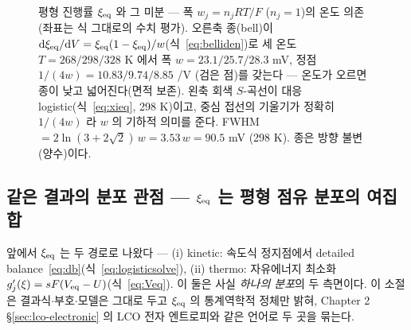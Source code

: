 \begin{figure}[t]
\caption{평형 진행률 $\xi_{\mathrm{eq}}$ 와 그 미분 --- 폭 $w_j{=}n_jRT/F$ ($n_j{=}1$)의 온도 의존(좌표는 식 그대로의
수치 평가). 오른축 종(bell)이 $\mathrm{d}\xi_{\mathrm{eq}}/\mathrm{d} V=\xi_{\mathrm{eq}}(1-\xi_{\mathrm{eq}})/w$(식~\eqref{eq:belliden})로 세 온도
$T{=}268/298/328$ K 에서 폭 $w{=}23.1/25.7/28.3$ mV, 정점 $1/(4w){=}10.83/9.74/8.85$ /V (검은 점)를 갖는다
--- 온도가 오르면 종이 낮고 넓어진다(면적 보존). 왼축 회색 $S$-곡선이 대응 logistic(식~\eqref{eq:xieq}, 298 K)이고,
중심 접선의 기울기가 정확히 $1/(4w)$ 라 $w$ 의 기하적 의미를 준다. FWHM $=2\ln(3{+}2\sqrt2)\,w=3.53\,w=90.5$ mV
(298 K). 종은 방향 불변(양수)이다.}
\label{fig:logistic}
\end{figure}

\subsection{같은 결과의 분포 관점 --- $\xi_{\mathrm{eq}}$ 는 평형 점유 분포의 여집합}\label{sec:dist}
앞에서 $\xi_{\mathrm{eq}}$ 는 두 경로로 나왔다 --- (i) kinetic: 속도식 정지점에서 detailed balance~\eqref{eq:db}(식~\eqref{eq:logisticsolve}),
(ii) thermo: 자유에너지 최소화 $g_j'(\xi)=sF(V_{\mathrm{eq}}-U)$(식~\eqref{eq:Veq}). 이 둘은 사실 \emph{하나의 분포}의 두 측면이다.
이 소절은 결과식$\cdot$부호$\cdot$모델은 그대로 두고 $\xi_{\mathrm{eq}}$ 의 통계역학적 정체만 밝혀,
Chapter 2 \S\ref{sec:lco-electronic} 의 LCO 전자 엔트로피와 같은 언어로 두 곳을 묶는다.


